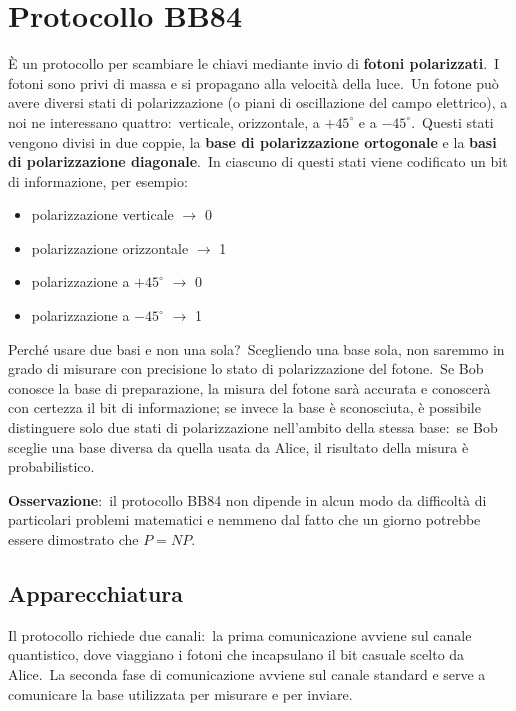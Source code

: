 \section{Protocollo BB84}

È un protocollo per scambiare le chiavi mediante invio di \textbf{fotoni polarizzati}.\
I fotoni sono privi di massa e si propagano alla velocità della luce.\
Un fotone può avere diversi stati di polarizzazione (o piani di oscillazione del campo elettrico), a noi ne interessano quattro:\ verticale, orizzontale, a $+45^{\circ}$ e a $-45^{\circ}$.\
Questi stati vengono divisi in due coppie, la \textbf{base di polarizzazione ortogonale} e la \textbf{basi di polarizzazione diagonale}.\
In ciascuno di questi stati viene codificato un bit di informazione, per esempio:
\begin{itemize}
    \item polarizzazione verticale $\rightarrow$ 0
    \item polarizzazione orizzontale $\rightarrow$ 1
    \item polarizzazione a $+45^{\circ}$ $\rightarrow$ 0
    \item polarizzazione a $-45^{\circ}$ $\rightarrow$ 1
\end{itemize}

\noindent Perché usare due basi e non una sola?\
Scegliendo una base sola, non saremmo in grado di misurare con precisione lo stato di polarizzazione del fotone.\
Se Bob conosce la base di preparazione, la misura del fotone sarà accurata e conoscerà con certezza il bit di informazione; se invece la base è sconosciuta, è possibile distinguere solo due stati di polarizzazione nell'ambito della stessa base:\ se Bob sceglie una base diversa da quella usata da Alice, il risultato della misura è probabilistico.\

\vspace{12pt}
\noindent\textbf{Osservazione}:\ il protocollo BB84 non dipende in alcun modo da difficoltà di particolari problemi matematici e nemmeno dal fatto che un giorno potrebbe essere dimostrato che $\mathit{P} = \mathit{NP}$.

\subsection{Apparecchiatura}

Il protocollo richiede due canali:\ la prima comunicazione avviene sul canale quantistico, dove viaggiano i fotoni che incapsulano il bit casuale scelto da Alice.\
La seconda fase di comunicazione avviene sul canale standard e serve a comunicare la base utilizzata per misurare e per inviare.\

